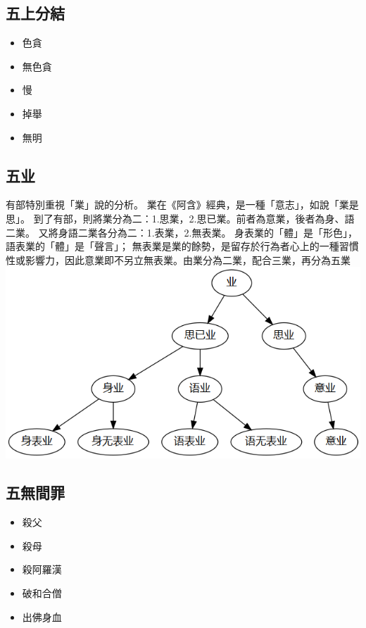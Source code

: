 \subsection{五上分結}
\begin{itemize}
  \item 色貪
  \item 無色貪
  \item 慢
  \item 掉舉
  \item 無明
\end{itemize}


\subsection{五业}
有部特別重視「業」說的分析。
業在《阿含》經典，是一種「意志」，如說「業是思」。
到了有部，則將業分為二：1.思業，2.思已業。前者為意業，後者為身、語二業。
又將身語二業各分為二：1.表業，2.無表業。
身表業的「體」是「形色」，語表業的「體」是「聲言」；
無表業是業的餘勢，是留存於行為者心上的一種習慣性或影響力，因此意業即不另立無表業。由業分為二業，配合三業，再分為五業
\includegraphics[scale=0.5]{释家/images/五业.png}

\subsection{五無間罪}
\begin{itemize}
  \item 殺父
  \item 殺母
  \item 殺阿羅漢
  \item 破和合僧
  \item 出佛身血
\end{itemize}
